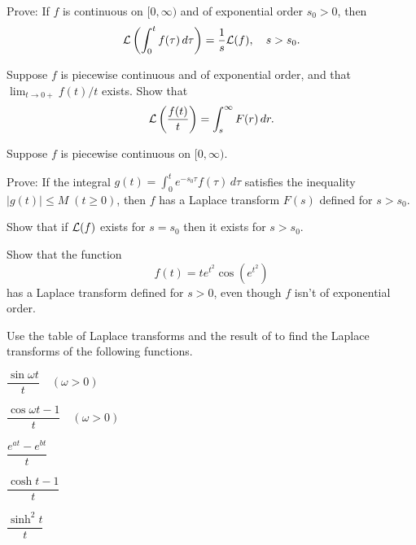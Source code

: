 \begin{exerciselist}
\item\label{exer:8.1.12}Prove: If $f$ is continuous on $[0,\infty)$ and of exponential order
$s_0>0$, then
\[
{\mathcal L}\left(\int^t_0 f(\tau)\,d\tau\right)=\frac{1}{s} {\mathcal L} (f),
\quad s>s_0.
\]

\item\label{exer:8.1.13}Suppose $f$ is piecewise continuous and of exponential
order, and that $\lim_{t\to 0+} f(t)/t$ exists.  Show that
\[
{\mathcal L}\left(\frac{f(t)}{t}\right)=\int^\infty_s F(r)\,dr.
\]

\item\label{exer:8.1.14}Suppose $f$ is piecewise continuous on $[0,\infty)$.
\begin{alist}
\item %
Prove: If the integral $g(t)=\int^t_0 e^{-s_0\tau} f(\tau)\,d\tau$
satisfies the inequality $|g(t)|\le M\; (t\ge 0)$, then $f$ has a
Laplace transform $F(s)$ defined for $s>s_0$. 
\item %
 Show that if ${\mathcal L}(f)$ exists for
$s=s_0$ then it exists for $s>s_0$.
\item %
Show that the function
\[
f(t)=te^{t^2}\cos(e^{t^2})
\]
has a Laplace transform defined for $s>0$, even though $f$ isn't  of
exponential order.
\end{alist}

\item\label{exer:8.1.15}Use the table of Laplace transforms and the result of
 to find the Laplace transforms of the following
functions.

\begin{alist*}[columns=3]
\item $\dfrac{\sin\omega t}{t}\quad(\omega>0)$
\item $\dfrac{\cos\omega t-1}{t}\quad (\omega>0)$
\item $\dfrac{e^{at}-e^{bt}}{t}$
\item $\dfrac{\cosh t-1}{t}$
\item $\dfrac{\sinh^2 t}{t}$
\end{alist*}


\end{exerciselist}
